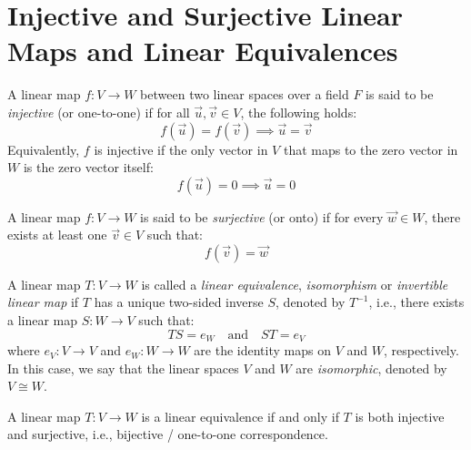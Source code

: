 \documentclass[
	11pt, %
	fleqn, %
	a4paper, %
]{LegrandOrangeBook}
\begin{document}
\newpage

\section{Injective and Surjective Linear Maps and Linear Equivalences}

\begin{definition}
    A linear map $f: V \to W$ between two linear spaces over a field $F$ is said to be \emph{injective} (or one-to-one) if for all $\vec{u}, \vec{v} \in V$, the following holds:
    \[
        f(\vec{u}) = f(\vec{v}) \implies \vec{u} = \vec{v}
    \]
    Equivalently, $f$ is injective if the only vector in $V$ that maps to the zero vector in $W$ is the zero vector itself:
    \[
        f(\vec{u}) = 0 \implies \vec{u} = 0
    \]
\end{definition}

\begin{definition}
    A linear map $f: V \to W$ is said to be \emph{surjective} (or onto) if for every $\vec{w} \in W$, there exists at least one $\vec{v} \in V$ such that:
    \[
        f(\vec{v}) = \vec{w}
    \]
\end{definition}

\begin{definition}
    A linear map $T: V \to W$ is called a \emph{linear equivalence}, \emph{isomorphism} or \emph{invertible linear map} if $T$ has a unique two-sided inverse $S$, denoted by $T^{-1}$, i.e., there exists a linear map $S: W \to V$ such that:
    \[
        TS = e_W \quad \text{and} \quad ST = e_V
    \]
    where $e_V: V \to V$ and $e_W: W \to W$ are the identity maps on $V$ and $W$, respectively.
    In this case, we say that the linear spaces $V$ and $W$ are \emph{isomorphic}, denoted by $V \cong W$.
\end{definition}

\begin{corollary}
    A linear map $T: V \to W$ is a linear equivalence if and only if $T$ is both injective and surjective, i.e., bijective / one-to-one correspondence.
\end{corollary}
\end{document}
